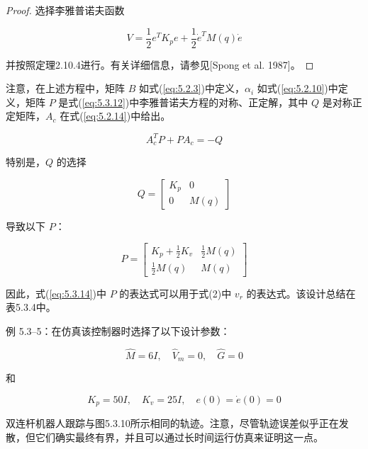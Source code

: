 \documentclass[UTF8,12pt,a4paper]{ctexart}
\begin{document}
\begin{proof}
选择李雅普诺夫函数

\begin{equation}
V = \frac{1}{2}e^T K_p e + \frac{1}{2}\dot{e}^T M(q)\dot{e}
\end{equation}

并按照定理2.10.4进行。有关详细信息，请参见[Spong et al. 1987]。
\end{proof}

注意，在上述方程中，矩阵 $B$ 如式(\ref{eq:5.2.3})中定义，$\alpha_i$ 如式(\ref{eq:5.2.10})中定义，矩阵 $P$ 是式(\ref{eq:5.3.12})中李雅普诺夫方程的对称、正定解，其中 $Q$ 是对称正定矩阵，$A_c$ 在式(\ref{eq:5.2.14})中给出。

\begin{equation}\label{eq:5.3.12}
A_c^T P + PA_c = -Q
\end{equation}

特别是，$Q$ 的选择

\begin{equation}\label{eq:5.3.13}
Q = \begin{bmatrix} K_p & 0 \\ 0 & M(q) \end{bmatrix}
\end{equation}

导致以下 $P$：

\begin{equation}\label{eq:5.3.14}
P = \begin{bmatrix} K_p + \frac{1}{2}K_v & \frac{1}{2}M(q) \\ \frac{1}{2}M(q) & M(q) \end{bmatrix}
\end{equation}

因此，式(\ref{eq:5.3.14})中 $P$ 的表达式可以用于式(2)中 $v_r$ 的表达式。该设计总结在表5.3.4中。

\begin{example}[饱和控制器 1]
例 5.3--5：在仿真该控制器时选择了以下设计参数：

\begin{equation}
\hat{M} = 6I, \quad \hat{V}_m = 0, \quad \hat{G} = 0
\end{equation}

和

\begin{equation}
K_p = 50I, \quad K_v = 25I, \quad e(0) = \dot{e}(0) = 0
\end{equation}

双连杆机器人跟踪与图5.3.10所示相同的轨迹。注意，尽管轨迹误差似乎正在发散，但它们确实最终有界，并且可以通过长时间运行仿真来证明这一点。
\end{example}
\end{document}
